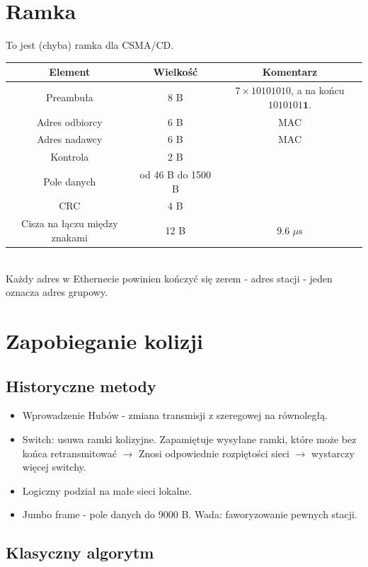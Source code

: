 	\section{Ramka}
		To jest (chyba) ramka dla CSMA/CD.\\
		\begin{table}[h]
			\begin{tabular}{|c|c|c|}
				\hline
				\textbf{Element} & Wielkość & \textbf{Komentarz} \\ \hline
				\multicolumn{1}{|c|}{Preambuła} 	& 8 B & $ 7\times 10101010$, a na końcu $ 1010101\textbf{1} $. \\ \hline
				\multicolumn{1}{|c|}{Adres odbiorcy}	& 6 B &	MAC \\ \hline
				\multicolumn{1}{|c|}{Adres nadawcy}	& 6 B &	MAC \\ \hline
				\multicolumn{1}{|c|}{Kontrola}		& 2 B & 	\\ \hline
				\multicolumn{1}{|c|}{Pole danych}	& od 46 B do 1500 B	& \\ \hline
				\multicolumn{1}{|c|}{CRC}			& 4 B & \\ \hline
				Cisza na łączu między znakami		& 12 B & 9.6 $ \mu $s \\ \hline
			\end{tabular}
		\end{table}\\
		Każdy adres w Ethernecie powinien kończyć się zerem - adres stacji - jeden oznacza adres grupowy.
	\section{Zapobieganie kolizji}
		\subsection{Historyczne metody}
			\begin{itemize}
				\item Wprowadzenie Hubów - zmiana transmisji z szeregowej na równoległą.
				\item Switch: usuwa ramki kolizyjne. Zapamiętuje wysyłane ramki, które może bez końca retransmitować $ \rightarrow $ Znosi odpowiednie rozpiętości sieci $ \rightarrow $ wystarczy więcej switchy.
				\item Logiczny podział na małe sieci lokalne.
				\item Jumbo frame - pole danych do 9000 B. Wada: faworyzowanie pewnych stacji.
			\end{itemize}
		\subsection{Klasyczny algorytm}
